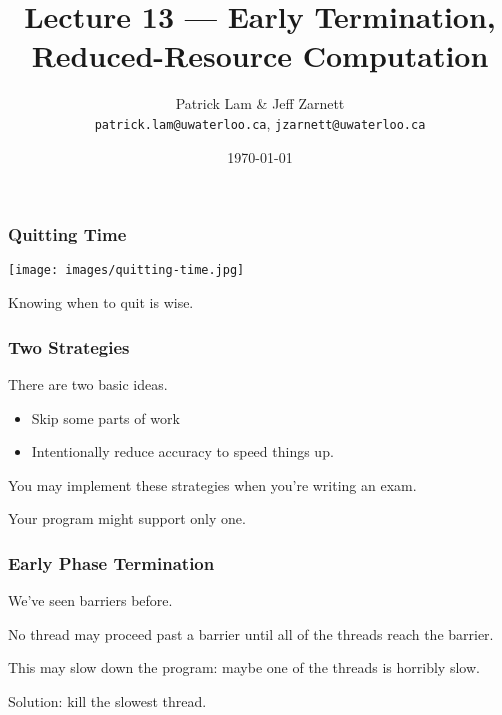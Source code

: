 


\title{Lecture 13 --- Early Termination, Reduced-Resource Computation }

\author{Patrick Lam \& Jeff Zarnett \\ \small \texttt{patrick.lam@uwaterloo.ca}, \texttt{jzarnett@uwaterloo.ca}}
\date{\today}




\begin{frame}
  \titlepage

 \end{frame}


\begin{frame}
\frametitle{Quitting Time}

\begin{center}
	\texttt{[image: images/quitting-time.jpg]}
\end{center}

Knowing when to quit is wise.

\end{frame}


\begin{frame}
\frametitle{Two Strategies}
There are two basic ideas. 

\begin{itemize}
\item Skip some parts of work
\item Intentionally reduce accuracy to speed things up. 
\end{itemize}

You may implement these strategies when you're writing an exam.

Your program might support only one.

\end{frame}



\begin{frame}
  \frametitle{Early Phase Termination}



  We've seen barriers before.

  No thread may proceed past a barrier until all of the threads
reach the barrier.

  This may slow down the program: maybe one of the threads is horribly
  slow.

  Solution: kill the slowest thread.


\end{frame}

